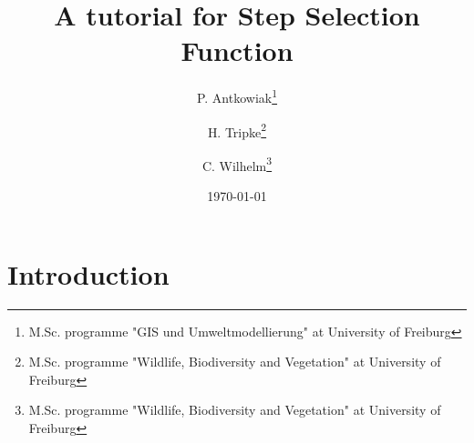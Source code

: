 \documentclass[11pt, a4paper]{article} %
\begin{document}



\title{A tutorial for Step Selection Function}

\author{P. Antkowiak\thanks{M.Sc. programme "GIS und Umweltmodellierung" at University of Freiburg} \and H. Tripke\thanks{M.Sc. programme "Wildlife, Biodiversity and Vegetation" at University of Freiburg} \and C. Wilhelm\thanks{M.Sc. programme "Wildlife, Biodiversity and Vegetation" at University of Freiburg}}

\date{\today} %

\maketitle


\tableofcontents

\newpage

\section{Introduction}%
\end{document}
